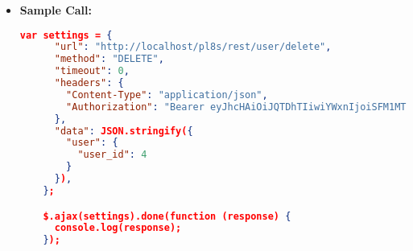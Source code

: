 \begin{itemize}
\begin{itemize}
 
		\end{itemize}
    \item \textbf{Sample Call:}
		\begin{lstlisting}[language=json]		
    var settings = {
      "url": "http://localhost/pl8s/rest/user/delete",
      "method": "DELETE",
      "timeout": 0,
      "headers": {
        "Content-Type": "application/json",
        "Authorization": "Bearer eyJhcHAiOiJQTDhTIiwiYWxnIjoiSFM1MTIifQ.eyJ1aWQiOjEsInJvbCI6ImFkbWluIiwic3RyI joiY3VzX1B3OHAyQlk2YkZYMm1iIiwiZGF0IjoxNzE0MzIwOTY0NzI5fQ.T1y3Lufb8wi1AxP6uy mJUrEDKo5dfgUe0seNIdsSw6yGQ_2R0awineJsMSa9TQu6lIy8dSH12JO9LPNzGtVJkg"                   
      },
      "data": JSON.stringify({
        "user": {
          "user_id": 4
        }
      }),
    };

    $.ajax(settings).done(function (response) {
      console.log(response);
    });
	\end{lstlisting}
  \end{itemize}		

